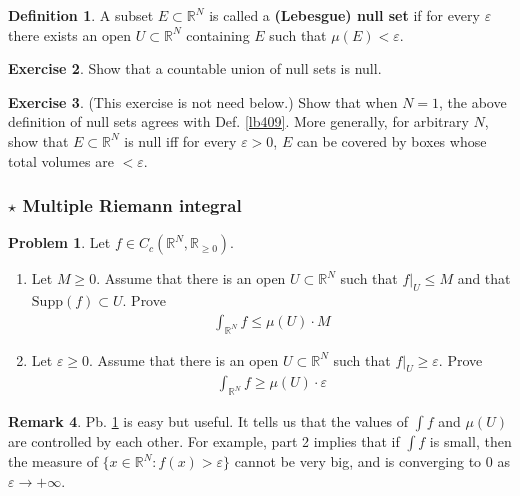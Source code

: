 \documentclass[12pt,b5paper,notitlepage]{article}
\theoremstyle{definition}
\newtheorem{df}{Definition}[section]
\newtheorem{exe}[df]{Exercise}
\newtheorem{rem}[df]{Remark}
\newtheorem{prob}{\color{red}Problem}[section]
\theoremstyle{plain}
\newcommand{\Rbb}{\mathbb R}
\newcommand{\Supp}{\mathrm{Supp}}
\newcommand{\eps}{\varepsilon}
\numberwithin{equation}{section}
\begin{document}
\begin{df}
A subset $E\subset\Rbb^N$ is called a \textbf{(Lebesgue) null set}  if for every $\eps$ there exists an open $U\subset\Rbb^N$ containing $E$ such that $\mu(E)<\eps$.
\end{df}

\begin{exe}
Show that a countable union of null sets is null.
\end{exe}

\begin{exe}
(This exercise is not need below.) Show that when $N=1$, the above definition of null sets agrees with Def. \ref{lb409}. More generally, for arbitrary $N$, show that $E\subset\Rbb^N$ is null iff for every $\eps>0$, $E$ can be covered by boxes whose total volumes are $<\eps$.
\end{exe}


\subsubsection{$\star$ Multiple Riemann integral}\label{lb534}

\begin{prob}\label{lb488}
Let $f\in C_c(\Rbb^N,\Rbb_{\geq0})$.
\begin{enumerate}
\item Let $M\geq0$. Assume that there is an open $U\subset\Rbb^N$ such that $f|_U\leq M$ and that $\Supp(f)\subset U$. Prove
\begin{align*}
\int_{\Rbb^N}f\leq\mu(U)\cdot M
\end{align*}
\item Let $\eps\geq0$. Assume that there is an open $U\subset\Rbb^N$ such that $f|_U\geq\eps$. Prove
\begin{align*}
\int_{\Rbb^N}f\geq\mu(U)\cdot \eps
\end{align*}
\end{enumerate}
\end{prob}


\begin{rem}
Pb. \ref{lb488} is easy but useful. It tells us that the values of $\int f$ and $\mu(U)$ are controlled by each other. For example, part 2 implies that if $\int f$ is small, then the measure of $\{x\in\Rbb^N:f(x)>\eps\}$ cannot be very big, and is converging to $0$ as $\eps\rightarrow+\infty$. 
\end{rem}
\end{document}
